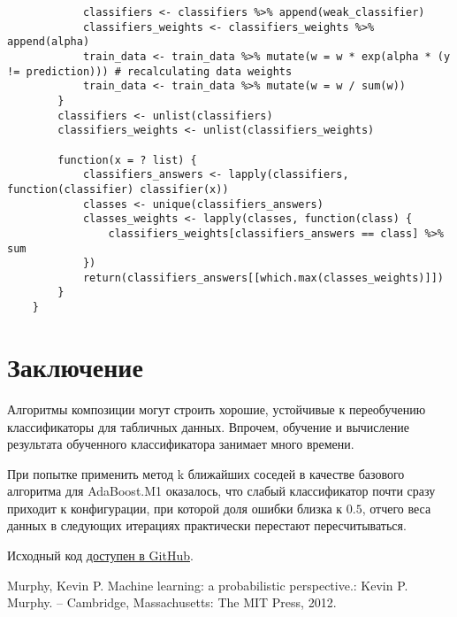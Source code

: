 \documentclass[a4paper,12pt]{article} %
\begin{document}
\begin{lstlisting}
			classifiers <- classifiers %>% append(weak_classifier)
			classifiers_weights <- classifiers_weights %>% append(alpha)
			train_data <- train_data %>% mutate(w = w * exp(alpha * (y != prediction))) # recalculating data weights
			train_data <- train_data %>% mutate(w = w / sum(w))
		}
		classifiers <- unlist(classifiers)
		classifiers_weights <- unlist(classifiers_weights)
		
		function(x = ? list) {
			classifiers_answers <- lapply(classifiers, function(classifier) classifier(x))
			classes <- unique(classifiers_answers)
			classes_weights <- lapply(classes, function(class) {
				classifiers_weights[classifiers_answers == class] %>% sum
			})
			return(classifiers_answers[[which.max(classes_weights)]])
		}
	}
\end{lstlisting}

\section{Заключение}
Алгоритмы композиции могут строить хорошие, устойчивые к переобучению классификаторы для табличных данных. Впрочем, обучение и вычисление результата обученного классификатора занимает много времени.

При попытке применить метод k ближайших соседей в качестве базового алгоритма для AdaBoost.M1 оказалось, что слабый классификатор почти сразу приходит к конфигурации, при которой доля ошибки близка к $0.5$, отчего веса данных в следующих итерациях практически перестают пересчитываться.

Исходный код \href{https://github.com/zuevval/source/tree/master/r/ml/boosting}{доступен в GitHub}.


\begin{thebibliography}{99}
	 Murphy, Kevin P. Machine learning: a probabilistic perspective.: Kevin P. Murphy. -- Cambridge, Massachusetts: The MIT Press, 2012.
\end{thebibliography}	
	
\end{document}
